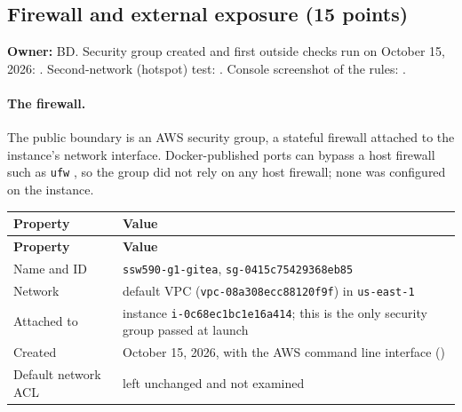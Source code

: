 \subsection{Firewall and external exposure (15 points)}
\label{Section:giteaFirewall}
\textbf{Owner:} BD. Security group created and first outside checks run on October 15, 2026: \StatusPass{}. Second-network (hotspot) test: \StatusPass{}. Console screenshot of the rules: \StatusPass{}.

\paragraph{The firewall.}
The public boundary is an AWS security group, a stateful firewall attached to
the instance's network interface. Docker-published ports can bypass a host
firewall such as \texttt{ufw} \cite{DockerFirewall}, so the group did not rely
on any host firewall; none was configured on the instance.

\begin{tabularx}{\linewidth}{L{3.3cm}Y}
\caption{Security group\label{Table:SecurityGroup}}\\
\toprule \textbf{Property} & \textbf{Value}\\ \midrule
\endfirsthead
\toprule \textbf{Property} & \textbf{Value}\\ \midrule
\endhead \bottomrule \endlastfoot
Name and ID & \texttt{ssw590-g1-gitea}, \texttt{sg-0415c75429368eb85}\\
Network & default VPC (\texttt{vpc-08a308ecc88120f9f}) in \texttt{us-east-1}\\
Attached to & instance \texttt{i-0c68ec1bc1e16a414}; this is the only security group passed at launch\\
Created & October 15, 2026, with the AWS command line interface ()\\
Default network ACL & left unchanged and not examined\\
\end{tabularx}

